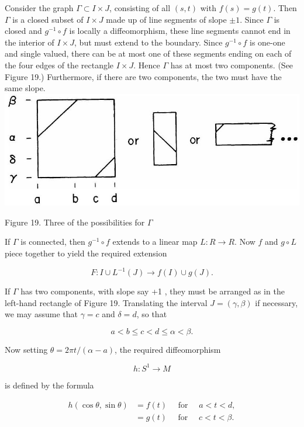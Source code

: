 \documentclass[10pt, letterpaper]{article}
\begin{document}
Consider the graph $\Gamma \subset I \times J$, consisting of all $(s, t)$ with $f(s)=g(t)$. Then $\Gamma$ is a closed subset of $I \times J$ made up of line segments of slope $\pm 1$. Since $\Gamma$ is closed and $g^{-1} \circ f$ is locally a diffeomorphism, these line segments cannot end in the interior of $I \times J$, but must extend to the boundary. Since $g^{-1} \circ f$ is one-one and single valued, there can be at most one of these segments ending on each of the four edges of the rectangle $I \times J$. Hence $\Gamma$ has at most two components. (See Figure 19.) Furthermore, if there are two components, the two must have the same slope.\\
\includegraphics[scale=0.2, center]{2025_05_28_7c9927389b272ddbc2c3g-67}

Figure 19. Three of the possibilities for $\Gamma$

If $\Gamma$ is connected, then $g^{-1} \circ f$ extends to a linear map $L: R \rightarrow R$. Now $f$ and $g \circ L$ piece together to yield the required extension

$$
F: I \cup L^{-1}(J) \rightarrow f(I) \cup g(J) .
$$

If $\Gamma$ has two components, with slope say +1 , they must be arranged as in the left-hand rectangle of Figure 19. Translating the interval $J=(\gamma, \beta)$ if necessary, we may assume that $\gamma=c$ and $\delta=d$, so that

$$
a<b \leq c<d \leq \alpha<\beta .
$$

Now setting $\theta=2 \pi t /(\alpha-a)$, the required diffeomorphism

$$
h: S^{1} \rightarrow M
$$

is defined by the formula

$$
\begin{aligned}
h(\cos \theta, \sin \theta) & =f(t) \quad \text { for } \quad a<t<d, \\
& =g(t) \quad \text { for } \quad c<t<\beta .
\end{aligned}
$$
\end{document}
